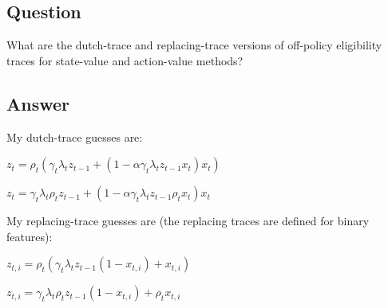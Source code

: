 \documentclass[11pt]{article}
\begin{document}
    \subsection{Question}

    What are the dutch-trace and replacing-trace versions of off-policy eligibility traces for state-value and action-value methods?

    \subsection*{Answer}

    \noindent My dutch-trace guesses are:

    \noindent $ z_t = \rho_{t} (\gamma_{t} \lambda_{t} z_{t-1} + (1-\alpha \gamma_t \lambda_t z_{t-1} x_t)x_t ) $

    \noindent $ z_t = \gamma_{t} \lambda_{t} \rho_{t} z_{t-1} + (1-\alpha \gamma_t \lambda_t z_{t-1} \rho_{t} x_t)x_t $

    \hfill \break
    \noindent My replacing-trace guesses are (the replacing traces are defined for binary features):

    \noindent $ z_{t,i} = \rho_{t} (\gamma_{t} \lambda_{t} z_{t-1} (1- x_{t,i}) + x_{t,i} ) $

    \noindent $ z_{t,i} = \gamma_{t} \lambda_{t} \rho_{t} z_{t-1} (1- x_{t,i}) + \rho_{t} x_{t,i} $
\end{document}
